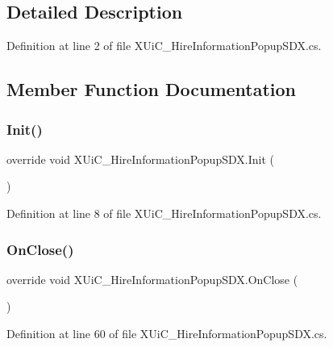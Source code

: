 \subsection{Detailed Description}


Definition at line 2 of file X\+Ui\+C\+\_\+\+Hire\+Information\+Popup\+S\+D\+X.\+cs.



\subsection{Member Function Documentation}
\mbox{\label{class_x_ui_c___hire_information_popup_s_d_x_ab8a280e23dab0b26daeb990b4ec11f2b}} 
\subsubsection{\texorpdfstring{Init()}{Init()}}
{\footnotesize\ttfamily override void X\+Ui\+C\+\_\+\+Hire\+Information\+Popup\+S\+D\+X.\+Init (\begin{DoxyParamCaption}{ }\end{DoxyParamCaption})}



Definition at line 8 of file X\+Ui\+C\+\_\+\+Hire\+Information\+Popup\+S\+D\+X.\+cs.

\mbox{\label{class_x_ui_c___hire_information_popup_s_d_x_aa080efe2cac66ade321e5c8505e9d4ec}} 
\subsubsection{\texorpdfstring{OnClose()}{OnClose()}}
{\footnotesize\ttfamily override void X\+Ui\+C\+\_\+\+Hire\+Information\+Popup\+S\+D\+X.\+On\+Close (\begin{DoxyParamCaption}{ }\end{DoxyParamCaption})}



Definition at line 60 of file X\+Ui\+C\+\_\+\+Hire\+Information\+Popup\+S\+D\+X.\+cs.

